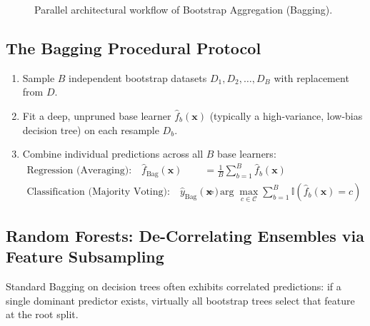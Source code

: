 \begin{figure}[htbp]
\caption{Parallel architectural workflow of Bootstrap Aggregation (Bagging).}
\label{fig:bagging_workflow}
\end{figure}

\subsection{The Bagging Procedural Protocol}
\begin{enumerate}
    \item Sample $B$ independent bootstrap datasets $D_1, D_2, \dots, D_B$ with replacement from $D$.
    \item Fit a deep, unpruned base learner $\hat{f}_b(\mathbf{x})$ (typically a high-variance, low-bias decision tree) on each resample $D_b$.
    \item Combine individual predictions across all $B$ base learners:
    \begin{align}
        \text{Regression (Averaging):} \quad \hat{f}_{\text{Bag}}(\mathbf{x}) &= \frac{1}{B} \sum_{b=1}^B \hat{f}_b(\mathbf{x}) \\
        \text{Classification (Majority Voting):} \quad \hat{y}_{\text{Bag}}(\mathbf{x}) &= \arg\max_{c \in \mathcal{C}} \sum_{b=1}^B \mathbb{I}(\hat{f}_b(\mathbf{x}) = c)
    \end{align}
\end{enumerate}

\subsection{Random Forests: De-Correlating Ensembles via Feature Subsampling}
Standard Bagging on decision trees often exhibits correlated predictions: if a single dominant predictor exists, virtually all bootstrap trees select that feature at the root split.

